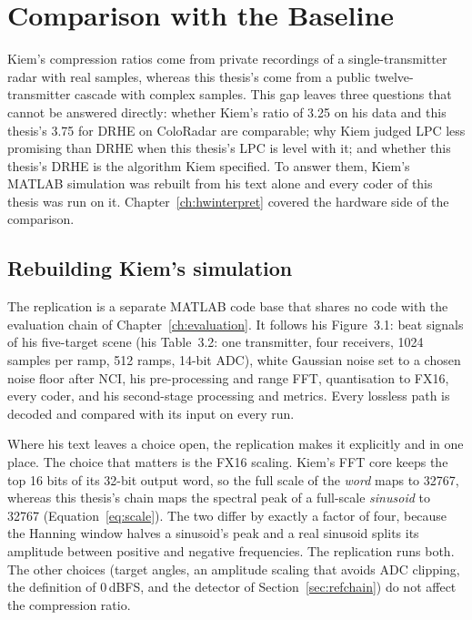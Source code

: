 \chapter{Comparison with the Baseline}
\label{ch:vskiem}

Kiem's compression ratios come from private recordings of a
single-transmitter radar with real samples, whereas this thesis's come from a
public twelve-transmitter cascade with complex samples. This gap leaves three
questions that cannot be answered directly: whether Kiem's ratio of 3.25 on his
data and this thesis's 3.75 for DRHE on ColoRadar are comparable; why Kiem
judged LPC less promising than DRHE when this thesis's LPC is level with it;
and whether this thesis's DRHE is the algorithm Kiem specified. To answer them,
Kiem's MATLAB simulation was rebuilt from his text alone and every coder of
this thesis was run on it. Chapter~\ref{ch:hwinterpret} covered the hardware
side of the comparison.

\section{Rebuilding Kiem's simulation}
\label{sec:kr_built}

The replication is a separate MATLAB code base that shares no code with the
evaluation chain of Chapter~\ref{ch:evaluation}. It follows his Figure~3.1:
beat signals of his five-target scene (his Table~3.2: one transmitter, four
receivers, 1024 samples per ramp, 512 ramps, 14-bit ADC), white Gaussian noise
set to a chosen noise floor after NCI, his pre-processing and range FFT,
quantisation to FX16, every coder, and his second-stage processing and
metrics. Every lossless path is decoded and compared with its input on every
run.

\label{sec:kr_assump}
Where his text leaves a choice open, the replication makes it explicitly and
in one place. The choice that matters is the FX16 scaling. Kiem's FFT core
keeps the top 16 bits of its 32-bit output word, so the full scale of the
\emph{word} maps to \num{32767}, whereas this thesis's chain maps the spectral
peak of a full-scale \emph{sinusoid} to \num{32767}
(Equation~\eqref{eq:scale}). The two differ by exactly a factor of four,
because the Hanning window halves a sinusoid's peak and a real sinusoid splits
its amplitude between positive and negative frequencies. The replication runs
both. The other choices (target angles, an amplitude scaling that avoids ADC
clipping, the definition of 0\,dBFS, and the detector of
Section~\ref{sec:refchain}) do not affect the compression ratio.

